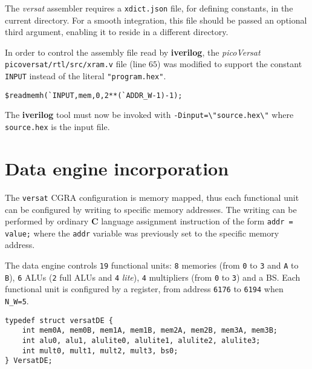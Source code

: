 The {\it versat} assembler requires a {\tt xdict.json} file,
for defining constants, in the current directory. For a
smooth integration, this file should be passed an optional
third argument, enabling it to reside in a different directory.

In order to control the assembly file read by {\bf iverilog},
the {\it picoVersat} {\tt picoversat/rtl/src/xram.v} file
(line $65$) was modified to support the constant {\tt INPUT}
instead of the literal \verb|"program.hex"|.
\begin{Verbatim}[baselinestretch=1.2]
      $readmemh(`INPUT,mem,0,2**(`ADDR_W-1)-1);
\end{Verbatim}

The {\bf iverilog} tool must now be invoked with
\verb|-Dinput=\"source.hex\"| where \verb|source.hex|
is the input file.

\section{Data engine incorporation}

The {\tt versat} {\sc CGRA} configuration is memory mapped,
thus each functional unit can be configured by writing to
specific memory addresses.
The writing can be performed by ordinary {\bf C} language
assignment instruction of the form {\tt *addr = value;}
where the {\tt addr} variable was previously set to the
specific memory address.

The data engine controls {\tt 19} functional units:
{\tt 8} memories (from {\tt 0} to {\tt 3} and {\tt A}
to {\tt B}), {\tt 6} {\sc ALU}s ({\tt 2} full {\sc ALU}s
and {\tt 4} {\em lite}), {\tt 4} multipliers (from {\tt 0}
to {\tt 3}) and a {\sc BS}.
Each functional unit is configured by a register, from
address {\tt 6176} to {\tt 6194} when {\tt N\_W=5}.
\begin{Verbatim}[baselinestretch=1.2]
typedef struct versatDE {
    int mem0A, mem0B, mem1A, mem1B, mem2A, mem2B, mem3A, mem3B;
    int alu0, alu1, alulite0, alulite1, alulite2, alulite3;
    int mult0, mult1, mult2, mult3, bs0;
} VersatDE;
\end{Verbatim}

